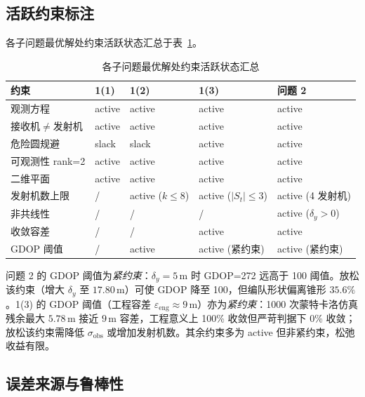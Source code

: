 \documentclass[12pt,a4paper]{ctexart}
\newcommand{\unit}[1]{\ensuremath{\,\mathrm{#1}}}
\newcommand{\tabref}[1]{表~\ref{#1}}
\begin{document}
\subsection{活跃约束标注}

各子问题最优解处约束活跃状态汇总于\tabref{tab:all-active}。

\begin{table}[H]
\centering
\caption{各子问题最优解处约束活跃状态汇总}
\label{tab:all-active}
\begin{tabular}{lllll}
\toprule
约束 & 1(1) & 1(2) & 1(3) & 问题 2 \\
\midrule
观测方程       & active & active & active & active \\
接收机$\neq$发射机 & active & active & active & active \\
危险圆规避     & slack  & slack & active & active \\
可观测性 rank=2 & active & active & active & active \\
二维平面       & active & active & active & active \\
发射机数上限   & /     & active ($k\leq 8$) & active ($|S_t|\leq 3$) & active (4 发射机) \\
非共线性       & /     & /    & /    & active ($\delta_y>0$) \\
收敛容差       & /     & /    & active & active \\
GDOP 阈值      & /     & active & active (紧约束) & active (紧约束) \\
\bottomrule
\end{tabular}
\end{table}

问题 2 的 GDOP 阈值为\emph{紧约束}：$\delta_y=5\unit{m}$ 时 GDOP=272 远高于 100 阈值。放松该约束（增大 $\delta_y$ 至 $17.80\unit{m}$）可使 GDOP 降至 100，但编队形状偏离锥形 $35.6\%$。1(3) 的 GDOP 阈值（工程容差 $\varepsilon_{\text{eng}}\approx 9\unit{m}$）亦为\emph{紧约束}：1000 次蒙特卡洛仿真残余最大 $5.78\unit{m}$ 接近 $9\unit{m}$ 容差，工程意义上 100\% 收敛但严苛判据下 0\% 收敛；放松该约束需降低 $\sigma_{\text{obs}}$ 或增加发射机数。其余约束多为 active 但非紧约束，松弛收益有限。

\subsection{误差来源与鲁棒性}
\end{document}
